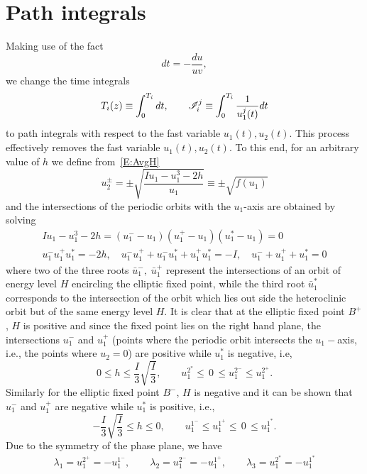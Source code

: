 \section{Path integrals}
\label{A:autoparam path_integrals}

Making use of the fact
\[
dt = -\frac{du}{uv},
\]
we change the time integrals
\[
{T_{i}(z)}\equiv\int_0^{T_{i}} dt, \qquad \mathscr I_{i}^{j}\equiv\int_0^{T_{i}} \frac{1}{u_1^j(t)}dt
\] 
to path integrals with respect to the fast variable $u_1(t),u_2(t)$. This process effectively removes the fast variable $u_1(t),u_2(t)$. To this end, for an arbitrary value of $h$ we define from~\eqref{E:AvgH}
\begin{equation}
u_2^{\pm}= \pm \sqrt{\frac{I u_1 - u_1^3 - 2 h}{u_1}} \equiv \pm\sqrt{f(u_1)}
\end{equation}
and the intersections of the periodic orbits with the $u_1$-axis are obtained by solving
\begin{equation}\label{E:roots}
\begin{aligned} 
I u_1 - u_1^3 - 2 h = (u_1^- - u_1)(u_1^+ - u_1)(u_1^* - u_1) = 0\\
u_1^- u_1^+ u_1^* = - 2 h, \quad u_1^- u_1^+ + u_1^- u_1^* + u_1^+ u_1^* = -I,\quad u_1^- + u_1^+ + u_1^* = 0
\end{aligned}
\end{equation}
where two of the three roots $\bar{u}_1^{-},\;\bar{u}_1^{+}$ represent the intersections of an orbit of energy level $H$ encircling the elliptic fixed point, while the third root $\bar{u}_1^{*}$ corresponds to the intersection of the orbit which lies out side the heteroclinic orbit but of the same energy level $H$. It is clear that at the elliptic fixed point $B^+$, $H$ is positive and since the fixed point lies on the right hand plane, the intersections $u_1^{-}$ and $u_1^{+}$ (points where the periodic orbit intersects the $u_1-$axis, i.e., the points where $u_2 = 0$) are positive while $u_1^{*}$ is negative, i.e,
\[
0 \leqslant h \leqslant \frac{I}{3}\sqrt{\frac{I}{3}}, \qquad u_1^{{2}^{*}} \leqslant
\, 0 \, \leqslant u_1^{2^-} \leqslant u_1^{2^+}.
\]
Similarly for the elliptic fixed point $B^-$, $H$ is negative and it can be shown that $u_1^-$ and $u_1^+$ are negative while $u_1^{*}$ is positive, i.e.,
\[
-\frac{I}{3}\sqrt{\frac{I}{3}} \leqslant h \leqslant 0, \qquad u_1^{{1}^{-}} \le
u_1^{{1}^{+}} \leqslant \, 0 \, \leqslant u_1^{{1}^{*}}.
\]
Due to the symmetry of the phase plane, we have
\begin{equation}
\begin{aligned} 
\lambda_1=u_1^{{2}^{+}}=-u_1^{{1}^{-}},\qquad \lambda_2=u_1^{{2}^{-}}=-u_1^{{1}^{+}},\qquad \lambda_3=u_1^{{2}^{*}}=-u_1^{{1}^{*}}
\end{aligned}\label{E:intersects}
\end{equation}
